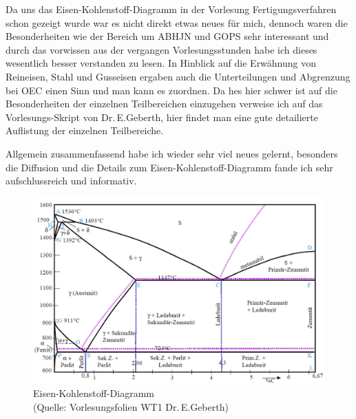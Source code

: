 \documentclass[12pt]{scrreprt}
\begin{document}
Da uns das Eisen-Kohlenstoff-Diagramm in der Vorlesung Fertigungsverfahren schon gezeigt wurde war es nicht direkt etwas neues für mich, dennoch waren die Besonderheiten wie der Bereich um ABHJN und GOPS sehr interessant und durch das vorwissen aus der vergangen Vorlesungsstunden habe ich dieses wesentlich besser verstanden zu lesen. 
In Hinblick auf die Erwähnung von Reineisen, Stahl und Gusseisen ergaben auch die Unterteilungen und Abgrenzung bei OEC einen Sinn und man kann es zuordnen. 
Da hes hier schwer ist auf die Besonderheiten der einzelnen Teilbereichen einzugehen verweise ich auf das Vorlesungs-Skript von Dr.\,E.Geberth, hier findet man eine gute detailierte Auflistung der einzelnen Teilbereiche.\bigskip

Allgemein zusammenfassend habe ich wieder sehr viel neues gelernt, besonders die Diffusion und die Details zum Eisen-Kohlenstoff-Diagramm fande ich sehr aufschlussreich und informativ.








\newpage

\begin{figure}[h]
	\includegraphics[width=\textwidth]{fec-diagramm.png}
	\caption{Eisen-Kohlenstoff-Diagramm\\(Quelle: Vorlesungsfolien WT1 Dr.\,E.Geberth)}
\end{figure}
\end{document}
